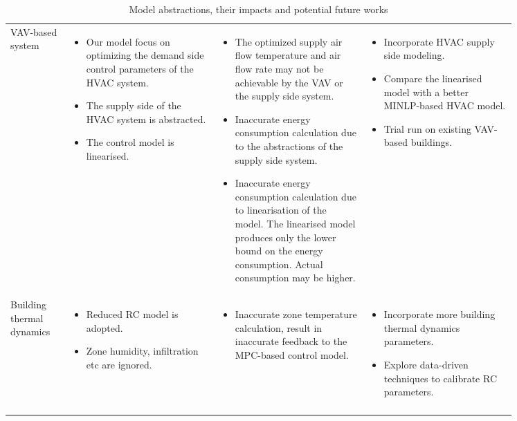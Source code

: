 \begin{table*}[!htbp]
\centering
\small
\begin{tabular}{p{0.1\linewidth} p{0.25\linewidth} p{0.25\linewidth}  p{0.25\linewidth}}
\hline \centering{\textbf{Model}} & \centering{\textbf{Abstractions}} & \centering{\textbf{Impacts}} & \centering{\textbf{Future Work}} \tabularnewline
\hline VAV-based system & 
\begin{itemize}
	\item Our model focus on optimizing the demand side control parameters of the HVAC system.
	\item The supply side of the HVAC system is abstracted.
	\item The control model is linearised.
\end{itemize} & 
\begin{itemize}		
	\item The optimized supply air flow temperature and air flow rate may not be achievable by the VAV or the supply side system.
	\item Inaccurate energy consumption calculation due to the abstractions of the supply side system.
	\item Inaccurate energy consumption calculation due to linearisation of the model. The linearised model produces only the lower bound on the energy consumption. Actual consumption may be higher.
\end{itemize} & 
\begin{itemize}	
	\item Incorporate HVAC supply side modeling.
	\item Compare the linearised model with a better MINLP-based HVAC model.
	\item Trial run on existing VAV-based buildings.
\end{itemize}
\tabularnewline
\hline Building thermal dynamics &
\begin{itemize}
	\item Reduced RC model is adopted.
	\item Zone humidity, infiltration etc are ignored.
\end{itemize}& 
\begin{itemize}
	\item Inaccurate zone temperature calculation, result in inaccurate feedback to the MPC-based control model.
\end{itemize}&
\begin{itemize}
	\item Incorporate more building thermal dynamics parameters.
	\item Explore data-driven techniques to calibrate RC parameters.	
\end{itemize}
 \tabularnewline
\tabularnewline
\end{tabular}
\normalsize
	\caption{Model abstractions, their impacts and potential future works}
	\label{tab:impact}
\end{table*}



